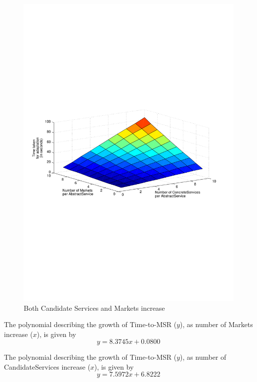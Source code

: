 \documentclass[10pt,journal,compsoc]{IEEEtran}
\begin{document}
\begin{figure}[htbp]%
	\centering
	\includegraphics[clip, trim=2cm 10cm 1cm 10cm, scale=0.5]{graphs/scaling_time_svcs_mkts.pdf}
	\caption{Both Candidate Services and Markets increase \label{fig:svc_and_mkts_scaling}}%
\end{figure}

The polynomial describing the growth of Time-to-MSR ($y$), as number of Markets increase ($x$), is given  by
\begin{equation}
    y =  8.3745x  +  0.0800 \label{eq:mkt_vs_cand}
\end{equation}

The polynomial describing the growth of Time-to-MSR ($y$), as number of CandidateServices increase ($x$), is given  by
\begin{equation}
    y =   7.5972x  +  6.8222 \label{eq:cand_vs_mkt}
\end{equation}
\end{document}
